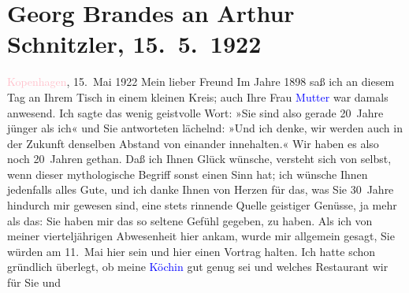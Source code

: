 

               \section[Georg Brandes an Arthur Schnitzler, 15. 5. 1922]{ Georg Brandes an Arthur Schnitzler, 15. 5. 1922}\nopagebreak{}\rehead{ }\normalsize\beginnumbering{} \toendnotes[C]{\smallbreak\pagebreak[2]} \toendnotes[C]{\smallbreak}\pstart
           \raggedleft{}{\pb}\textcolor{pink}{Kopenhagen}{}\ledrightnote{\textcolor{pink}{Kopenhagen}}, 15. Mai 1922\pend
           \pstart{}Mein lieber Freund\pend\pstart
           Im Jahre 1898 saß ich an diesem Tag an Ihrem Tisch in einem kleinen
               Kreis; auch Ihre Frau \textcolor{blue}{Mutter}{}
               war damals anwesend. Ich sagte das wenig geistvolle Wort: »Sie sind also gerade
               20 Jahre jünger als ich« und Sie antworteten lächelnd: »Und ich denke, wir werden
               auch in der Zukunft denselben Abstand von einander innehalten.«\pend
           \pstart
           Wir haben es also noch 20 Jahren gethan. Daß ich Ihnen Glück wünsche, versteht sich
               von selbst, wenn dieser mythologische Begriff sonst einen Sinn hat; ich wünsche Ihnen
               jedenfalls alles Gute, und ich danke Ihnen von Herzen für das, was Sie 30 Jahre
               hindurch mir gewesen sind, eine stets rinnende Quelle geistiger Genüsse, ja mehr als
               das: Sie haben mir das so seltene Gefühl gegeben, \emph{\label{K_L02383_1v}\label{K_L02383_1h}} zu haben.\pend
           \pstart
           Als ich von meiner vierteljährigen Abwesenheit hier ankam, wurde mir allgemein
               gesagt, Sie würden am 11. Mai hier sein und hier einen Vortrag halten.
               Ich hatte schon gründlich überlegt, ob meine \textcolor{blue}{Köchin}{} gut genug sei und welches Restaurant wir für Sie und

